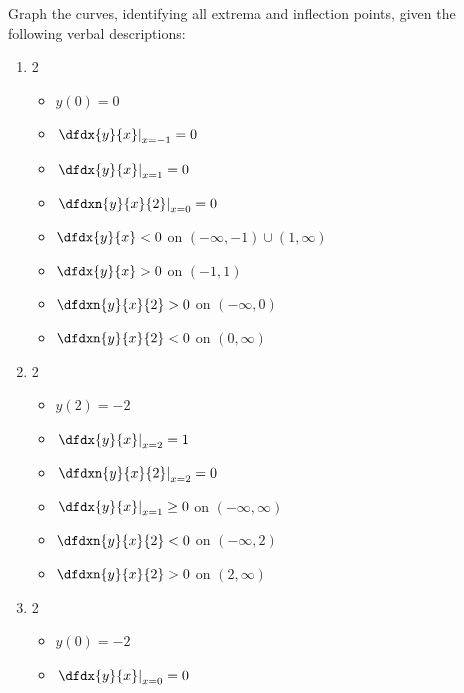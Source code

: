 \begin{ProblemSection}
  \begin{embeddedproblem}{}
    Graph the curves, identifying all extrema and inflection points,
    given the following verbal descriptions:
    \begin{enumerate}[label={\bf{}(\alph*)}]
    \item
      \begin{multicols}{2}
        \begin{itemize}
        \item[ ] $y(0)=0$
        \item[ ]  $\left.\dfdx{y}{x}\right|_{x=-1} = 0$
        \item [ ] $\left.\dfdx{y}{x}\right|_{x= 1} = 0$
        \item [ ] $\left.\dfdxn{y}{x}{2}\right|_{x= 0} = 0$
        \item [ ] $\dfdx{y}{x} <0$ on $(-\infty,-1)\cup(1,\infty)$
        \item [ ] $\dfdx{y}{x}>0$ on $(-1,1)$
        \item [ ] $\dfdxn{y}{x}{2}>0$ on $(-\infty,0)  $
        \item [ ] $\dfdxn{y}{x}{2}<0$ on $(0,\infty)  $
        \end{itemize}
      \end{multicols}
    \item
      \begin{multicols}{2}
        \begin{itemize}
        \item [ ] $y(2)=-2$
        \item [ ] $\left.\dfdx{y}{x}\right|_{x= 2} = 1$
        \item [ ] $\left.\dfdxn{y}{x}{2}\right|_{x= 2} = 0$
        \item [ ] $\left.\dfdx{y}{x}\right|_{x= 1} \ge 0$ on
          $(-\infty, \infty)$
        \item[ ] $\dfdxn{y}{x}{2}<0$ on $(-\infty,2)$
        \item[ ] $\dfdxn{y}{x}{2}>0$ on $(2,\infty)$
        \end{itemize}
      \end{multicols}
    \item 
      \begin{multicols}{2}
        \begin{itemize}
        \item [ ] $y(0)=-2$
        \item [ ] $\left.\dfdx{y}{x}\right|_{x= 0} = 0$

\end{itemize}
\end{multicols}
\end{enumerate}
\end{embeddedproblem}
\end{ProblemSection}
